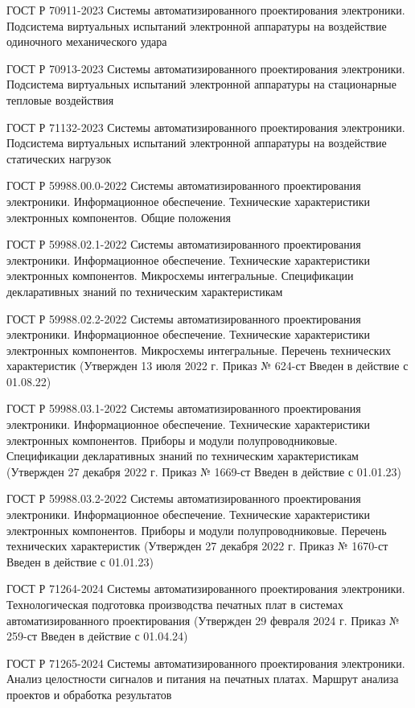 ГОСТ Р 70911-2023 Системы автоматизированного проектирования электроники. Подсистема виртуальных испытаний электронной аппаратуры на воздействие одиночного механического удара

ГОСТ Р 70913-2023 Системы автоматизированного проектирования электроники. Подсистема виртуальных испытаний электронной аппаратуры на стационарные тепловые воздействия

ГОСТ Р 71132-2023 Системы автоматизированного проектирования электроники. Подсистема виртуальных испытаний электронной аппаратуры на воздействие статических нагрузок

ГОСТ Р 59988.00.0-2022 Системы автоматизированного проектирования электроники. Информационное обеспечение. Технические характеристики электронных компонентов. Общие положения

ГОСТ Р 59988.02.1-2022 Системы автоматизированного проектирования электроники. Информационное обеспечение. Технические характеристики электронных компонентов. Микросхемы интегральные. Спецификации декларативных знаний по техническим характеристикам

ГОСТ Р 59988.02.2-2022 Системы автоматизированного проектирования электроники. Информационное обеспечение. Технические характеристики электронных компонентов. Микросхемы интегральные. Перечень технических характеристик (Утвержден 13 июля 2022 г.  Приказ № 624-ст Введен в действие с 01.08.22)

ГОСТ Р 59988.03.1-2022 Системы автоматизированного проектирования электроники. Информационное обеспечение. Технические характеристики электронных компонентов. Приборы и модули полупроводниковые. Спецификации декларативных знаний по техническим характеристикам (Утвержден 27 декабря 2022 г.  Приказ № 1669-ст Введен в действие с 01.01.23)

ГОСТ Р 59988.03.2-2022 Системы автоматизированного проектирования электроники. Информационное обеспечение. Технические характеристики электронных компонентов. Приборы и модули полупроводниковые. Перечень технических характеристик (Утвержден 27 декабря 2022 г.  Приказ № 1670-ст Введен в действие с 01.01.23)

ГОСТ Р 71264-2024 Системы автоматизированного проектирования электроники. Технологическая подготовка производства печатных плат в системах автоматизированного проектирования (Утвержден 29 февраля 2024 г.  Приказ № 259-ст Введен в действие с 01.04.24)

ГОСТ Р 71265-2024 Системы автоматизированного проектирования электроники. Анализ целостности сигналов и питания на печатных платах. Маршрут анализа проектов и обработка результатов


